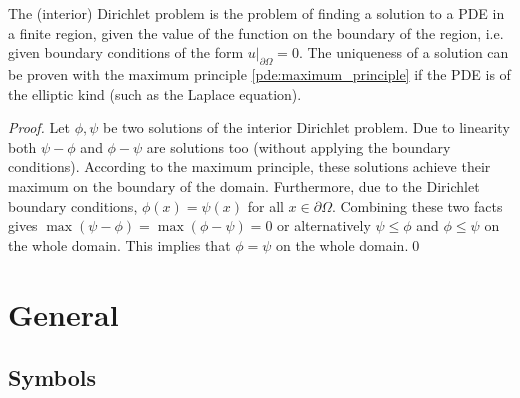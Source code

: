     The (interior) Dirichlet problem is the problem of finding a solution to a PDE in a finite region, given the value of the function on the boundary of the region, i.e. given boundary conditions of the form $u|_{\partial\Omega}=0$. The uniqueness of a solution can be proven with the maximum principle \ref{pde:maximum_principle} if the PDE is of the elliptic kind (such as the Laplace equation).
    \begin{proof}
        Let $\phi,\psi$ be two solutions of the interior Dirichlet problem. Due to linearity both $\psi-\phi$ and $\phi-\psi$ are solutions too (without applying the boundary conditions). According to the maximum principle, these solutions achieve their maximum on the boundary of the domain. Furthermore, due to the Dirichlet boundary conditions, $\phi(x)=\psi(x)$ for all $x\in\partial\Omega$. Combining these two facts gives $\max(\psi-\phi) = \max(\phi-\psi) = 0$ or alternatively $\psi\leq\phi$ and $\phi\leq\psi$ on the whole domain. This implies that $\phi=\psi$ on the whole domain.\qed
    \end{proof}



\section{General}\label{section:pde_general}
\subsection{Symbols}


